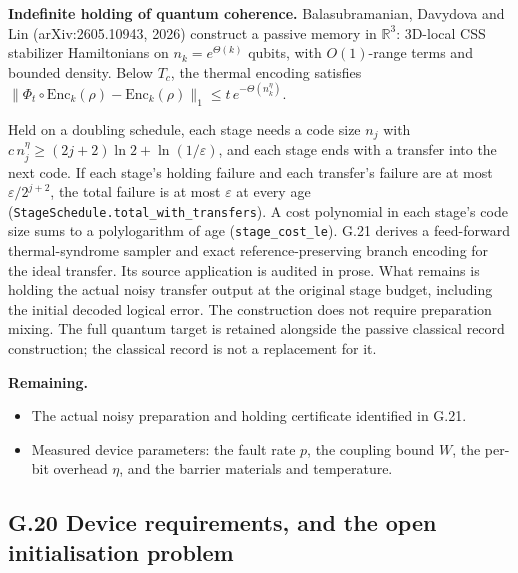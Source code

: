 \documentclass[
]{article}
\providecommand{\tightlist}{%
  \setlength{\itemsep}{0pt}\setlength{\parskip}{0pt}}
\begin{document}
\textbf{Indefinite holding of quantum coherence.} Balasubramanian,
Davydova and Lin (arXiv:2605.10943, 2026) construct a passive memory in
\(\mathbb R^3\): 3D-local CSS stabilizer Hamiltonians on
\(n_k=e^{\Theta(k)}\) qubits, with \(O(1)\)-range terms and bounded
density. Below \(T_c\), the thermal encoding satisfies
\(\|\Phi_t\circ\mathrm{Enc}_k(\rho)-\mathrm{Enc}_k(\rho)\|_1\le t\,e^{-\Theta(n_k^\eta)}\).

Held on a doubling schedule, each stage needs a code size \(n_j\) with
\(c\,n_j^\eta\ge(2j+2)\ln2+\ln(1/\varepsilon)\), and each stage ends
with a transfer into the next code. If each stage's holding failure and
each transfer's failure are at most \(\varepsilon/2^{j+2}\), the total
failure is at most \(\varepsilon\) at every age
(\texttt{S\allowbreak{}t\allowbreak{}a\allowbreak{}g\allowbreak{}e\allowbreak{}S\allowbreak{}c\allowbreak{}h\allowbreak{}e\allowbreak{}d\allowbreak{}u\allowbreak{}l\allowbreak{}e\allowbreak{}.\allowbreak{}t\allowbreak{}o\allowbreak{}t\allowbreak{}a\allowbreak{}l\allowbreak{}\_\allowbreak{}w\allowbreak{}i\allowbreak{}t\allowbreak{}h\allowbreak{}\_\allowbreak{}t\allowbreak{}r\allowbreak{}a\allowbreak{}n\allowbreak{}s\allowbreak{}f\allowbreak{}e\allowbreak{}r\allowbreak{}s}).
A cost polynomial in each stage's code size sums to a polylogarithm of
age (\texttt{stage\_cost\_le}). G.21 derives a feed-forward
thermal-syndrome sampler and exact reference-preserving branch encoding
for the ideal transfer. Its source application is audited in prose. What
remains is holding the actual noisy transfer output at the original
stage budget, including the initial decoded logical error. The
construction does not require preparation mixing. The full quantum
target is retained alongside the passive classical record construction;
the classical record is not a replacement for it.

\textbf{Remaining.}

\begin{itemize}
\tightlist
\item
  The actual noisy preparation and holding certificate identified in
  G.21.
\item
  Measured device parameters: the fault rate \(p\), the coupling bound
  \(W\), the per-bit overhead \(\eta\), and the barrier materials and
  temperature.
\end{itemize}

\subsection{G.20 Device requirements, and the open initialisation
problem}\label{g.20-device-requirements-and-the-open-initialisation-problem}
\end{document}
